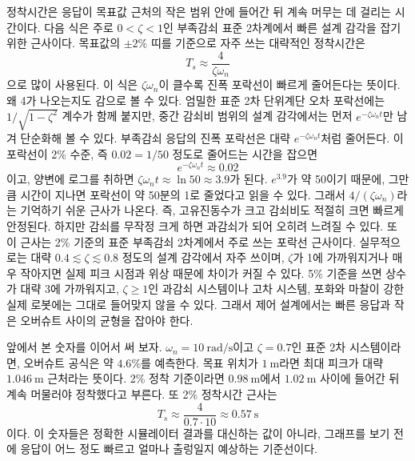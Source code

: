 정착시간은 응답이 목표값 근처의 작은 범위 안에 들어간 뒤 계속 머무는 데 걸리는 시간이다.
다음 식은 주로 $0<\zeta<1$인 부족감쇠 표준 2차계에서 빠른 설계 감각을 잡기 위한 근사이다.
목표값의 $\pm2\%$ 띠를 기준으로 자주 쓰는 대략적인 정착시간은
\begin{equation}
  T_s \approx \frac{4}{\zeta\omega_n}
\end{equation}
으로 많이 사용된다.
이 식은 $\zeta\omega_n$이 클수록 진폭 포락선이 빠르게 줄어든다는 뜻이다.
왜 4가 나오는지도 감으로 볼 수 있다.
엄밀한 표준 2차 단위계단 오차 포락선에는 $1/\sqrt{1-\zeta^2}$ 계수가 함께 붙지만, 중간 감쇠비 범위의 설계 감각에서는 먼저 $e^{-\zeta\omega_n t}$만 남겨 단순화해 볼 수 있다.
부족감쇠 응답의 진폭 포락선은 대략 $e^{-\zeta\omega_n t}$처럼 줄어든다.
이 포락선이 2\% 수준, 즉 $0.02=1/50$ 정도로 줄어드는 시간을 잡으면
\begin{equation}
  e^{-\zeta\omega_n t}\approx0.02
\end{equation}
이고, 양변에 로그를 취하면 $\zeta\omega_n t\approx\ln 50\approx3.9$가 된다.
$e^{3.9}$가 약 50이기 때문에, 그만큼 시간이 지나면 포락선이 약 50분의 1로 줄었다고 읽을 수 있다.
그래서 $4/(\zeta\omega_n)$라는 기억하기 쉬운 근사가 나온다.
즉, 고유진동수가 크고 감쇠비도 적절히 크면 빠르게 안정된다.
하지만 감쇠를 무작정 크게 하면 과감쇠가 되어 오히려 느려질 수 있다.
또 이 근사는 2\% 기준의 표준 부족감쇠 2차계에서 주로 쓰는 포락선 근사이다.
실무적으로는 대략 $0.4\lesssim\zeta\lesssim0.8$ 정도의 설계 감각에서 자주 쓰이며, $\zeta$가 1에 가까워지거나 매우 작아지면 실제 피크 시점과 위상 때문에 차이가 커질 수 있다.
5\% 기준을 쓰면 상수가 대략 3에 가까워지고, $\zeta\ge1$인 과감쇠 시스템이나 고차 시스템, 포화와 마찰이 강한 실제 로봇에는 그대로 들어맞지 않을 수 있다.
그래서 제어 설계에서는 빠른 응답과 작은 오버슈트 사이의 균형을 잡아야 한다.

앞에서 본 숫자를 이어서 써 보자.
$\omega_n=10~\mathrm{rad/s}$이고 $\zeta=0.7$인 표준 2차 시스템이라면, 오버슈트 공식은 약 $4.6\%$를 예측한다.
목표 위치가 $1~\mathrm{m}$라면 최대 피크가 대략 $1.046~\mathrm{m}$ 근처라는 뜻이다.
2\% 정착 기준이라면 $0.98~\mathrm{m}$에서 $1.02~\mathrm{m}$ 사이에 들어간 뒤 계속 머물러야 정착했다고 부른다.
또 2\% 정착시간 근사는
\begin{equation}
  T_s \approx \frac{4}{0.7\cdot10}\approx0.57~\mathrm{s}
\end{equation}
이다.
이 숫자들은 정확한 시뮬레이터 결과를 대신하는 값이 아니라, 그래프를 보기 전에 응답이 어느 정도 빠르고 얼마나 출렁일지 예상하는 기준선이다.

